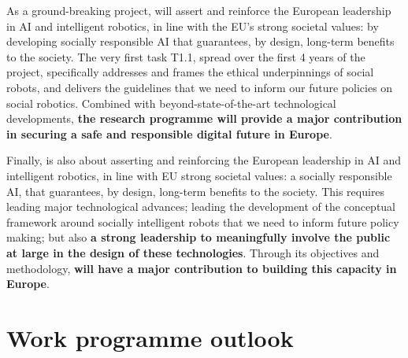 As a ground-breaking project, \project will assert and reinforce the European leadership in AI and
intelligent robotics, in line with the EU's strong societal values: by developing
socially responsible AI that guarantees, by design, long-term benefits to the
society. The very first task T1.1, spread over the first 4 years of the project,
specifically addresses and frames the ethical underpinnings of social robots,
and delivers the guidelines that we need to inform our future policies on social
robotics. Combined with beyond-state-of-the-art technological developments,
\textbf{the \project research programme will provide a major contribution in
securing a safe and responsible digital future in Europe}. 

Finally, \project is also about asserting and reinforcing the European
leadership in AI and intelligent robotics, in line with EU strong societal
values: a socially responsible AI, that guarantees, by design, long-term
benefits to the society. This requires leading major technological advances;
leading the development of the conceptual framework around socially intelligent
robots that we need to inform future policy making; but also \textbf{a strong
leadership to meaningfully involve the public at large in the design of these
technologies}. Through its objectives and methodology, \textbf{\project will
have a major contribution to building this capacity in Europe}. 





\section{Work programme outlook}


